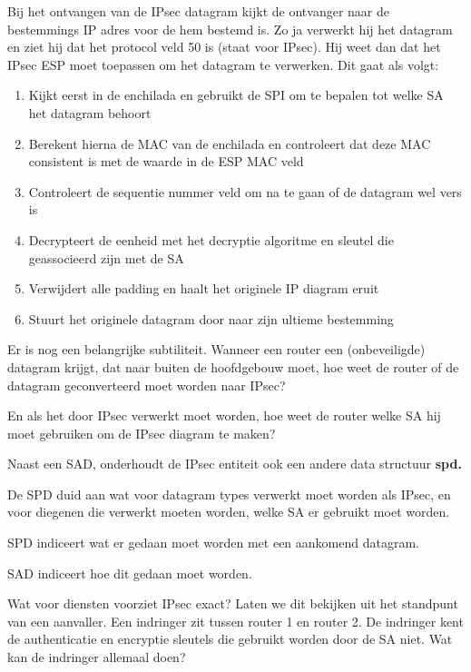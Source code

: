 \noindent Bij het ontvangen van de IPsec datagram kijkt de ontvanger naar de bestemmings IP adres voor de hem bestemd is. Zo ja verwerkt hij het datagram en ziet hij dat het protocol veld 50 is (staat voor IPsec). Hij weet dan dat het IPsec ESP moet toepassen om het datagram te verwerken. Dit gaat als volgt:
\begin{enumerate}

\item Kijkt eerst in de enchilada en gebruikt de SPI om te bepalen tot welke SA het datagram behoort
\item Berekent hierna de MAC van de enchilada en controleert dat deze MAC consistent is met de waarde in de ESP MAC veld
\item Controleert de sequentie nummer veld om na te gaan of de datagram wel vers is
\item Decrypteert de eenheid met het decryptie algoritme en sleutel die geassocieerd zijn met de SA
\item Verwijdert alle padding en haalt het originele IP diagram eruit
\item Stuurt het originele datagram door naar zijn ultieme bestemming
\end{enumerate}

\noindent Er is nog een belangrijke subtiliteit. Wanneer een router een (onbeveiligde) datagram krijgt, dat naar buiten de hoofdgebouw moet, hoe weet de router of de datagram geconverteerd moet worden naar IPsec?

\noindent En als het door IPsec verwerkt moet worden, hoe weet de router welke SA hij moet gebruiken om de IPsec diagram te maken?

\noindent Naast een SAD, onderhoudt de IPsec entiteit ook een andere data structuur \textbf{\acrfull{spd}. }

\noindent De SPD duid aan wat voor datagram types verwerkt moet worden als IPsec, en voor diegenen die verwerkt moeten worden, welke SA er gebruikt moet worden.

\noindent SPD indiceert wat er gedaan moet worden met een aankomend datagram.

\noindent SAD indiceert hoe dit gedaan moet worden.




\noindent Wat voor diensten voorziet IPsec exact? Laten we dit bekijken uit het standpunt van een aanvaller.
Een indringer zit tussen router 1 en router 2. De indringer kent de authenticatie en encryptie sleutels die gebruikt worden door de SA niet. Wat kan de indringer allemaal doen?

